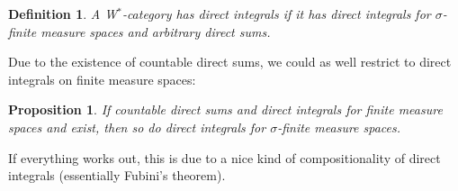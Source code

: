 \documentclass[reqno,T1]{amsproc}
\theoremstyle{plain}
\newtheorem{prop}[thm]{Proposition}
\newtheorem{defn}[thm]{Definition}
\theoremstyle{remark}
\numberwithin{equation}{section}
\begin{document}

\begin{defn}
A W$^*$-category \emph{has direct integrals} if it has direct integrals for $\sigma$-finite measure spaces and arbitrary direct sums.
\end{defn}


Due to the existence of countable direct sums, we could as well restrict to direct integrals on finite measure spaces:

\begin{prop}
If countable direct sums and direct integrals for finite measure spaces and exist, then so do direct integrals for $\sigma$-finite measure spaces.
\end{prop}

If everything works out, this is due to a nice kind of compositionality of direct integrals (essentially Fubini's theorem).




\end{document}
